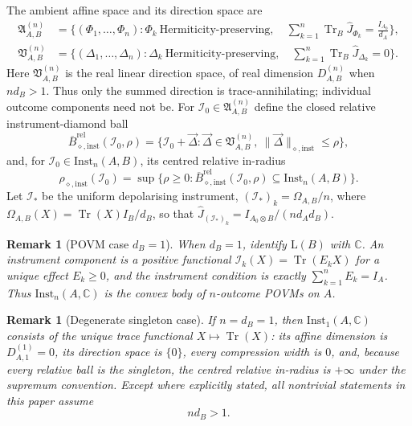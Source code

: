 \documentclass[11pt,a4paper]{article}
\newtheorem{remark}[theorem]{Remark}
\newcommand{\Lin}{\mathrm{L}}
\newcommand{\Inst}{\mathrm{Inst}}
\newcommand{\Tr}{\operatorname{Tr}}
\newcommand{\Jhat}{\widehat J}
\newcommand{\vD}{\vec{\Delta}}
\begin{document}
The ambient affine space and its direction space are
\begin{align*}
\mathfrak A_{A,B}^{(n)}
&=\Big\{(\Phi_1,\dots,\Phi_n):
\Phi_k\ \text{Hermiticity-preserving},\quad
\sum_{k=1}^n\Tr_B\Jhat_{\Phi_k}=\frac{I_{A_0}}{d_A}\Big\},\\
\mathfrak V_{A,B}^{(n)}
&=\Big\{(\Delta_1,\dots,\Delta_n):
\Delta_k\ \text{Hermiticity-preserving},\quad
\sum_{k=1}^n\Tr_B\Jhat_{\Delta_k}=0\Big\}.
\end{align*}
Here $\mathfrak V_{A,B}^{(n)}$ is the real linear direction space, of real dimension $D_{A,B}^{(n)}$ when $nd_B>1$.
Thus only the summed direction is trace-annihilating; individual outcome components need not be. For $\mathcal I_0\in\mathfrak A_{A,B}^{(n)}$ define the closed relative instrument-diamond ball
\[
\overline B_{\diamond,\mathrm{inst}}^{\mathrm{rel}}(\mathcal I_0,\rho)
=\big\{\mathcal I_0+\vD:\vD\in\mathfrak V_{A,B}^{(n)},\ \|\vD\|_{\diamond,\mathrm{inst}}\le\rho\big\},
\]
and, for $\mathcal I_0\in\Inst_n(A,B)$, its centred relative in-radius
\[
\rho_{\diamond,\mathrm{inst}}(\mathcal I_0)
=\sup\Big\{\rho\ge0:
\overline B_{\diamond,\mathrm{inst}}^{\mathrm{rel}}(\mathcal I_0,\rho)
\subseteq\Inst_n(A,B)\Big\}.
\]
Let $\mathcal I_*$ be the uniform depolarising instrument, $(\mathcal I_*)_k=\Omega_{A,B}/n$, where $\Omega_{A,B}(X)=\Tr(X)I_B/d_B$, so that $\Jhat_{(\mathcal I_*)_k}=I_{A_0\otimes B}/(n d_Ad_B)$.

\begin{remark}[POVM case $d_B=1$]
\label{rem:povm}
When $d_B=1$, identify $\Lin(B)$ with $\mathbb C$. An instrument component is a positive functional $\mathcal I_k(X)=\Tr(E_kX)$ for a unique effect $E_k\ge0$, and the instrument condition is exactly $\sum_{k=1}^nE_k=I_A$. Thus $\Inst_n(A,\mathbb C)$ is the convex body of $n$-outcome POVMs on $A$.
\end{remark}

\begin{remark}[Degenerate singleton case]
\label{rem:degenerate}
If $n=d_B=1$, then $\Inst_1(A,\mathbb C)$ consists of the unique trace functional $X\mapsto\Tr(X)$: its affine dimension is $D_{A,1}^{(1)}=0$, its direction space is $\{0\}$, every compression width is $0$, and, because every relative ball is the singleton, the centred relative in-radius is $+\infty$ under the supremum convention. Except where explicitly stated, all nontrivial statements in this paper assume
\[
n d_B>1.
\]
\end{remark}
\end{document}
